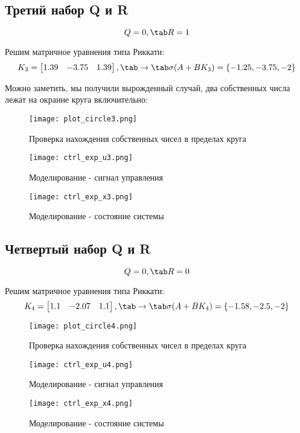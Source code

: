 \subsection{Третий набор Q и R}
$$Q=0, \tab R = 1$$

Решим  матричное уравнения типа Риккати:
$$
K_3 = \begin{bmatrix}
    1.39 & -3.75 & 1.39
\end{bmatrix}, \tab\rightarrow\tab \sigma(A+BK_3)=\{  -1.25 , -3.75,  -2 \}
$$

Можно заметить, мы получили вырожденный случай, два собственных числа лежат на окраине круга включительно:

\begin{figure}[ht]
  \centering
  \texttt{[image: plot\_circle3.png]}
  \caption{Проверка нахождения собственных чисел в пределах круга}
\end{figure}
\newpage
\begin{figure}[ht]
  \centering
  \texttt{[image: ctrl\_exp\_u3.png]}
  \caption{Моделирование - сигнал управления}
\end{figure}
\begin{figure}[ht]
  \centering
  \texttt{[image: ctrl\_exp\_x3.png]}
  \caption{Моделирование - состояние системы}
\end{figure}

\newpage
\subsection{Четвертый набор Q и R}
$$Q=0, \tab R = 0$$

Решим  матричное уравнения типа Риккати:
$$
K_4 = \begin{bmatrix}
    1.1 & -2.07 & 1.1
\end{bmatrix}, \tab\rightarrow\tab \sigma(A+BK_4)=\{  -1.58 , -2.5,  -2 \}
$$


\begin{figure}[ht]
  \centering
  \texttt{[image: plot\_circle4.png]}
  \caption{Проверка нахождения собственных чисел в пределах круга}
\end{figure}
\newpage
\begin{figure}[ht]
  \centering
  \texttt{[image: ctrl\_exp\_u4.png]}
  \caption{Моделирование - сигнал управления}
\end{figure}
\begin{figure}[ht]
  \centering
  \texttt{[image: ctrl\_exp\_x4.png]}
  \caption{Моделирование - состояние системы}
\end{figure}

